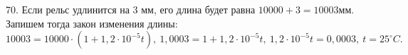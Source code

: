 70. Если рельс удлинится на 3 мм, его длина будет равна $10000+3=10003$мм. Запишем тогда закон изменения длины: $10003=10000\cdot(1+1,2\cdot10^{-5}t),\
1,0003=1+1,2\cdot10^{-5}t,\ 1,2\cdot10^{-5}t=0,0003,\ t=25^\circ C.$\\
